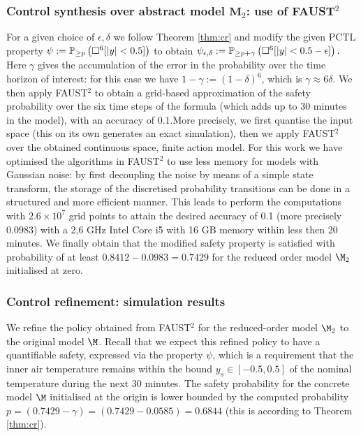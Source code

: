 \documentclass[letterpaper, 10 pt, conference]{amsart}
\theoremstyle{definition}
\theoremstyle{example}
\theoremstyle{remark}
\newcommand{\eps}{\epsilon}
\begin{document}
\subsubsection*{Control synthesis over abstract model $\mathbf M_2$: use of FAUST$^2$}  
For a given choice of $\eps,\delta$ we follow Theorem \ref{thm:cr} and modify the given PCTL property 
\(
\psi:=\mathbb{P}_{\geq p}\left( \Box^6[ |y|<0.5]\right)
\)
to obtain   
\(
\psi_{\epsilon,\delta}:=\mathbb{P}_{\geq p+\gamma}\left( \always^6[ |y|<0.5-\eps]\right). 
\)
Here $\gamma$ gives the accumulation of the error in the probability over the time horizon of interest: 
for this case we have $1-\gamma:=(1-\delta)^{6}$, which is $\gamma\approx6\delta$.  
We then apply FAUST$^2$ to obtain a grid-based approximation of the safety probability over the six time steps of the formula (which adds up to 30 minutes in the model), 
with an accuracy of $0.1$.More precisely, 
we first quantise the input space (this on its own generates an exact simulation), 
then we apply FAUST$^2$ \cite{FAUST13} over the obtained continuous space, finite action model.  
For this work we have optimised the algorithms in FAUST$^2$ to use less memory for models with Gaussian noise:  
by first decoupling the noise by means of a simple state transform, the storage of the discretised probability transitions can be done in a structured and more efficient manner. 
This leads to perform the computations with $2.6\times 10^7$ grid points to attain the desired accuracy of 0.1 (more precisely $0.0983$) with a 2,6 GHz Intel Core i5  with 16 GB memory within less then 20 minutes. 
We finally obtain that the modified safety property is satisfied with probability of at least $0.8412-0.0983 = 0.7429$ for the reduced order model $\M_2$ initialised at zero. 
 
 
\subsubsection*{Control refinement: simulation results} 
We refine the policy obtained from FAUST$^2$  for the reduced-order model $\M_2$ to the original model $\M$. 
Recall that we expect this refined policy to have a quantifiable safety, expressed via the property $\psi$, 
which is a requirement that the inner air temperature remains within the bound $y_{s} \in [-0.5,0.5]$ of the nominal temperature during the next 30 minutes. 
The safety probability for the concrete model $\M$ initialised at the origin is lower bounded by the computed probability $p= (0.7429-\gamma)=( 0.7429-0.0585) = 0.6844$ 
(this is according to Theorem \ref{thm:cr}). 
 
\end{document}
